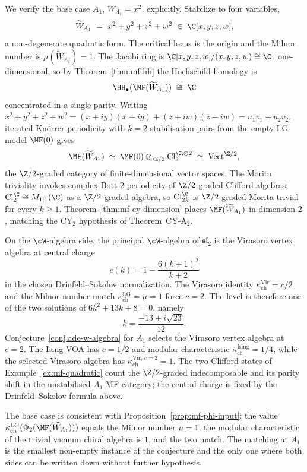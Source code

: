 We verify the base case $A_1$, $W_{A_1} = x^2$, explicitly. Stabilize to four variables,
\[
 \widetilde{W}_{A_1} \;=\; x^2 + y^2 + z^2 + w^2 \;\in\; \C[x, y, z, w] ,
\]
a non-degenerate quadratic form. The critical locus is the origin and the Milnor number is $\mu(\widetilde{W}_{A_1}) = 1$. The Jacobi ring is $\C[x, y, z, w]/(x, y, z, w) \cong \C$, one-dimensional, so by Theorem~\ref{thm:mf-hh} the Hochschild homology is
\[
 \HH_\bullet(\MF(\widetilde{W}_{A_1})) \;\cong\; \C
\]
concentrated in a single parity. Writing $x^2 + y^2 + z^2 + w^2 = (x{+}iy)(x{-}iy) + (z{+}iw)(z{-}iw) = u_1 v_1 + u_2 v_2$, iterated Kn\"orrer periodicity with $k = 2$ stabilisation pairs from the empty LG model $\MF(0)$ gives
\[
 \MF(\widetilde{W}_{A_1}) \;\simeq\; \MF(0) \otimes_{\Z/2} \mathrm{Cl}_2^{\C, \otimes 2} \;\simeq\; \mathrm{Vect}^{\Z/2},
\]
the $\Z/2$-graded category of finite-dimensional vector spaces. The Morita triviality invokes complex Bott $2$-periodicity of $\Z/2$-graded Clifford algebras: $\mathrm{Cl}^{\C}_2 \cong M_{1|1}(\C)$ as a $\Z/2$-graded algebra, so $\mathrm{Cl}^{\C}_{2k}$ is $\Z/2$-graded-Morita trivial for every $k \geq 1$. Theorem~\ref{thm:mf-cy-dimension} places $\MF(\widetilde{W}_{A_1})$ in dimension $2$, matching the CY$_2$ hypothesis of Theorem~CY-A$_2$.

On the $\cW$-algebra side, the principal $\cW$-algebra of $\mathfrak{sl}_2$ is the Virasoro vertex algebra at central charge
\[
 c(k)=1-\frac{6(k+1)^2}{k+2}
\]
in the chosen Drinfeld--Sokolov normalization. The Virasoro identity
$\kappa_{\mathrm{ch}}^{\mathrm{Vir}}=c/2$ and the Milnor-number match
$\kappa_{\mathrm{ch}}^{\mathrm{LG}}=\mu=1$ force $c=2$. The level is therefore one of
the two solutions of \(6k^2+13k+8=0\), namely
\[
 k=\frac{-13\pm i\sqrt{23}}{12}.
\]
Conjecture~\ref{conj:ade-w-algebra} for $A_1$ selects the Virasoro
vertex algebra at $c=2$. The Ising VOA has $c=1/2$ and modular
characteristic \(\kappa_{\mathrm{ch}}^{\mathrm{Ising}}=1/4\), while the
selected Virasoro algebra has
\(\kappa_{\mathrm{ch}}^{\mathrm{Vir},\,c=2}=1\). The two Clifford states
of Example~\ref{ex:mf-quadratic} count the $\Z/2$-graded indecomposable
and its parity shift in the unstabilised $A_1$ MF category; the central
charge is fixed by the Drinfeld--Sokolov formula above.

The base case is consistent with Proposition~\ref{prop:mf-phi-input}: the value $\kappa_{\mathrm{ch}}^{\mathrm{LG}}(\Phi_2(\MF(\widetilde{W}_{A_1})))$ equals the Milnor number $\mu = 1$, the modular characteristic of the trivial vacuum chiral algebra is $1$, and the two match. The matching at $A_1$ is the smallest non-empty instance of the conjecture and the only one where both sides can be written down without further hypothesis.


